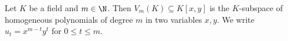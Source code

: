 Let $K$ be a field and $m\in\N$. Then $V_m(K)\subseteq K[x,y]$ is the $K$-subspace of homogeneous polynomials of degree $m$ in two
variables $x,y$. We write $u_t=x^{m-t}y^t$ for $0\le t\le m$.
